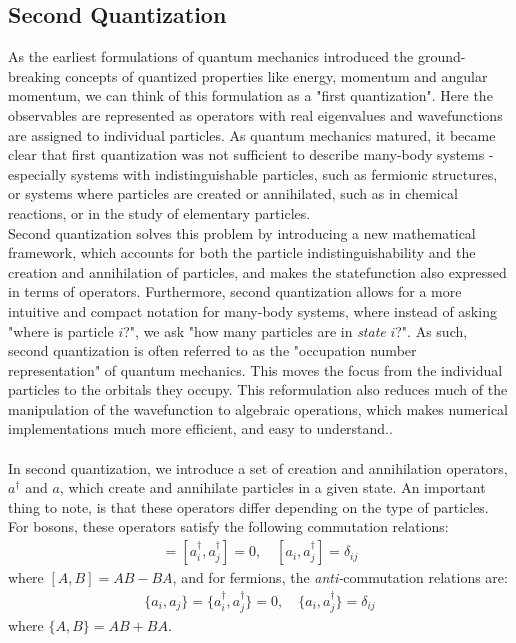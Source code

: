 \documentclass{subfiles}
\begin{document}
\subsection*{Second Quantization}
As the earliest formulations of quantum mechanics introduced the ground-breaking concepts of quantized properties like energy, momentum and angular momentum, we can think of this formulation as a "first quantization". Here the observables are represented as operators with real eigenvalues and wavefunctions are assigned to individual particles.
As quantum mechanics matured, it became clear that first quantization was not sufficient to describe many-body systems - especially systems with indistinguishable particles, such as fermionic structures, or systems where particles are created or annihilated, such as in chemical reactions, or in the study of elementary particles.\\  
Second quantization solves this problem by introducing a new mathematical framework, which accounts for both the particle indistinguishability and the creation and annihilation of particles, and makes the statefunction also expressed in terms of operators. Furthermore, second quantization allows for a more intuitive and compact notation for many-body systems, where instead of asking "where is particle $i$?", we ask "how many particles are in \emph{state} $i$?". 
As such, second quantization is often referred to as the "occupation number representation" of quantum mechanics. This moves the focus from the individual particles to the orbitals they occupy. This reformulation also reduces much of the manipulation of the wavefunction to algebraic operations, which makes numerical implementations much more efficient, and easy to understand.\cite{helgaker2013molecular}.
\\ \\ In second quantization, we introduce a set of creation and annihilation operators, $a^\dagger$ and $a$, which create and annihilate particles in a given state. An important thing to note, is that these operators differ depending on the type of particles. For bosons, these operators satisfy the following commutation relations:
\begin{align}
    [a_i, a_j] = [a^\dagger_i, a^\dagger_j] = 0, \quad [a_i, a^\dagger_j] = \delta_{ij}\label{eq:commutation}
\end{align}
where $[A, B] = AB - BA$, and for fermions, the \emph{anti-}commutation relations are:
\begin{align}
    \{a_i, a_j\} = \{a^\dagger_i, a^\dagger_j\} = 0, \quad \{a_i, a^\dagger_j\} = \delta_{ij}\label{eq:anti_commutation}
\end{align}
where $\{A, B\} = AB + BA$.
\end{document}
